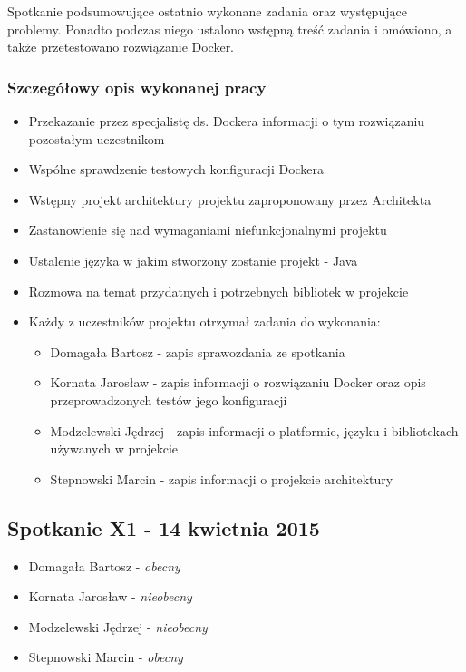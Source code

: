 \par{Spotkanie podsumowujące ostatnio wykonane zadania oraz występujące problemy. Ponadto podczas niego ustalono wstępną treść zadania i omówiono, a także przetestowano rozwiązanie Docker.}


\subsubsection*[Szczegółowy opis wykonanej pracy]{Szczegółowy opis wykonanej pracy}

\begin{itemize}
\item Przekazanie przez specjalistę ds. Dockera informacji o tym rozwiązaniu pozostałym uczestnikom
\item Wspólne sprawdzenie testowych konfiguracji Dockera
\item Wstępny projekt architektury projektu zaproponowany przez Architekta
\item Zastanowienie się nad wymaganiami niefunkcjonalnymi projektu
\item Ustalenie języka w jakim stworzony zostanie projekt - Java
\item Rozmowa na temat przydatnych i potrzebnych bibliotek w projekcie

\item Każdy z uczestników projektu otrzymał zadania do wykonania:
\begin{itemize}
\item Domagała Bartosz - zapis sprawozdania ze spotkania
\item Kornata Jarosław - zapis informacji o rozwiązaniu Docker oraz opis przeprowadzonych testów jego konfiguracji
\item Modzelewski Jędrzej - zapis informacji o platformie, języku i bibliotekach używanych w projekcie
\item Stepnowski Marcin - zapis informacji o projekcie architektury
\end{itemize}
\end{itemize}

\subsection[Spotkanie X1 - 14 kwietnia 2015]{Spotkanie X1 - 14 kwietnia 2015}

\begin{itemize}
\item Domagała Bartosz - \textit{obecny}
\item Kornata Jarosław - \textit{nieobecny}
\item Modzelewski Jędrzej - \textit{nieobecny}
\item Stepnowski Marcin - \textit{obecny}
\end{itemize}

